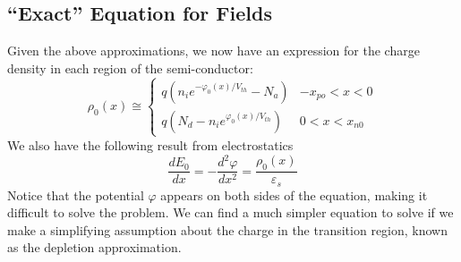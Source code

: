 \subsection{“Exact” Equation for Fields}
Given the above approximations, we now have an expression for the charge density in each region of the semi-conductor:
\begin{equation}
 \rho _0(x) \cong \left\{ 
  \begin{array}{*{20}{c}}
 q({n_i}{e^{ - {\varphi _0}(x)/{V_{th}}}} - {N_a}) &  - {x_{po}} < x < 0\\
 q({N_d} - {n_i}{e^{{\varphi _0}(x)/{V_{th}}}}) & 0 < x < {x_{n0}}
 \end{array} 
 \right.
 \end{equation}
We also have the following result from electrostatics
\begin{equation} 
	\frac{{d{E_0}}}{{dx}} =  - \frac{{{d^2}\varphi }}{{d{x^2}}} = \frac{{{\rho _0}(x)}}{{{\varepsilon _s}}} 
\end{equation}
Notice that the potential $\varphi$ appears on both sides of the equation, making it difficult to solve the problem.   We can find a much simpler equation to solve if we make a simplifying assumption about the charge in the transition region, known as the depletion approximation.
